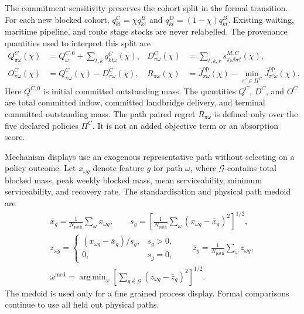\documentclass[a4paper,fleqn]{cas-sc}
\DeclareMathOperator*{\argmin}{arg\,min}
\begin{document}
The commitment sensitivity preserves the cohort split in the formal transition.
For each new blocked cohort,
$q^C_{kt}=\chi q^B_{kt}$ and $q^D_{kt}=(1-\chi)q^B_{kt}$. Existing waiting,
maritime pipeline, and route stage stocks are never relabelled. The provenance
quantities used to interpret this split are
\begin{equation}
 \begin{aligned}
 Q^C_{\pi\omega}(\chi)
 &=Q^{C,0}_{\omega}+\sum_{t,k}q^C_{kt\omega}(\chi),
 &D^C_{\pi\omega}(\chi)
 &=\sum_{t,k,r}s^{M,C}_{\pi\omega krt}(\chi),\\
 O^C_{\pi\omega}(\chi)
 &=Q^C_{\pi\omega}(\chi)-D^C_{\pi\omega}(\chi),
 &R_{\pi\omega}(\chi)
 &=\bar J^{\mathrm{op}}_{\pi\omega}(\chi)
 -\min_{\pi'\in\Pi^C}\bar J^{\mathrm{op}}_{\pi'\omega}(\chi).
 \end{aligned}
 \label{eq:commitment-sensitivity-metrics}
\end{equation}
Here $Q^{C,0}$ is initial committed outstanding mass. The quantities $Q^C$,
$D^C$, and $O^C$ are total committed inflow, committed landbridge delivery,
and terminal committed outstanding mass. The path paired regret
$R_{\pi\omega}$ is defined only over the five declared policies
$\Pi^C$. It is not an added objective term or an absorption score.

Mechanism displays use an exogenous representative path without selecting on a
policy outcome. Let $x_{\omega g}$ denote feature $g$ for path $\omega$, where
$\mathcal G$ contains total blocked mass, peak weekly blocked mass, mean
serviceability, minimum serviceability, and recovery rate. The standardisation
and physical path medoid are
\begin{equation}
 \begin{gathered}
 \bar x_g=\frac{1}{N_{\mathrm{path}}}\sum_{\omega}x_{\omega g},
 \qquad
 s_g=\left[
 \frac{1}{N_{\mathrm{path}}}\sum_{\omega}(x_{\omega g}-\bar x_g)^2
 \right]^{1/2},\\
 z_{\omega g}=
 \begin{cases}
 (x_{\omega g}-\bar x_g)/s_g,&s_g>0,\\
 0,&s_g=0,
 \end{cases}
 \qquad
 \bar z_g=\frac{1}{N_{\mathrm{path}}}\sum_{\omega}z_{\omega g},\\
 \omega^{\mathrm{med}}
 =\argmin_{\omega}\left[
 \sum_{g\in\mathcal G}(z_{\omega g}-\bar z_g)^2
 \right]^{1/2}.
 \end{gathered}
 \label{eq:mechanism-path-medoid}
\end{equation}
The medoid is used only for a fine grained process display. Formal comparisons
continue to use all held out physical paths.
\end{document}
